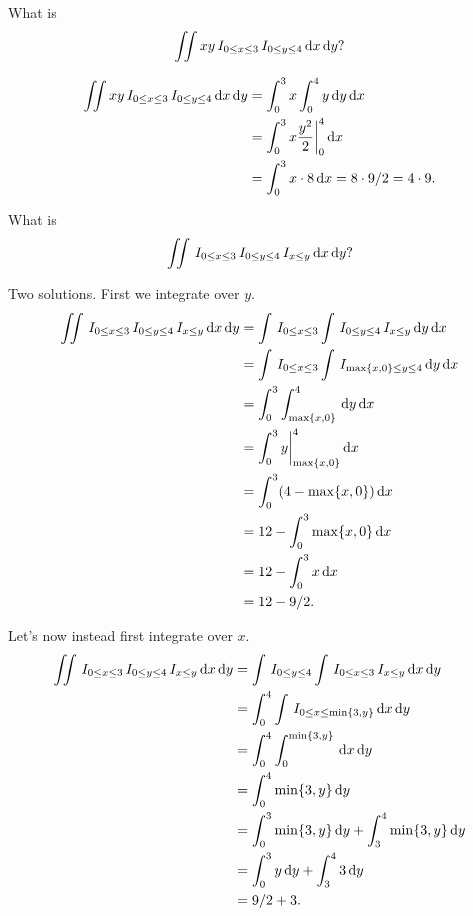 \begin{exercise}
What is
\begin{equation}
\label{eq:185}
\iint x y \,I_{0\leq x \leq 3}\,I_{0\leq y \leq 4} \,\textrm{d}x \,\textrm{d}y?
\end{equation}
\begin{solution}
\begin{align*}
\iint xy \,I_{0\leq x \leq 3}\,I_{0\leq y \leq 4} \,\textrm{d}x \,\textrm{d}y
&=\int_{0}^{3} x \int_{0}^{4} y \,\textrm{d}y \,\textrm{d}x\\
&=\int_{0}^{3} x \frac{y^{2}} 2 \biggr|_{0}^{4} \,\textrm{d}x\\
&= \int_{0}^{3} x\cdot 8 \,\textrm{d}x = 8\cdot 9/2 = 4\cdot 9.
\end{align*}
\end{solution}
\end{exercise}

\begin{exercise}
What is
\begin{align}
\label{eq:285}
\iint \,I_{0\leq x \leq 3} \,I_{0\leq y \leq 4}\,I_{x\leq y}\,\textrm{d}x \,\textrm{d}y?
\end{align}
\begin{solution}
Two solutions. First we integrate over $y$.
\begin{align}
\label{eq:385}
\iint \,I_{0\leq x \leq 3} \,I_{0\leq y \leq 4}\,I_{x\leq y}\,\textrm{d}x \,\textrm{d}y
&=\int \,I_{0\leq x \leq 3} \int \,I_{0\leq y \leq 4}\,I_{x\leq y}\,\textrm{d}y \,\textrm{d}x\\
&=\int \,I_{0\leq x \leq 3} \int \,I_{\max\{x, 0\} \leq y \leq 4}\,\textrm{d}y \,\textrm{d}x\\
&=\int_{0}^{3} \int_{\max\{x, 0\}}^{4}\,\textrm{d}y \,\textrm{d}x\\
&=\int_{0}^{3} y\biggr|_{\max\{x, 0\}}^{4} \,\textrm{d}x\\
&=\int_{0}^{3}  (4-\max\{x, 0\}) \,\textrm{d}x\\
&=12 - \int_{0}^{3} \max\{x, 0\} \,\textrm{d}x\\
&=12 - \int_{0}^{3} x  \,\textrm{d}x\\
&=12 - 9/2.
\end{align}

Let's now instead first integrate over $x$.
\begin{align}
\label{eq:485}
\iint \,I_{0\leq x \leq 3} \,I_{0\leq y \leq 4}\,I_{x\leq y}\,\textrm{d}x \,\textrm{d}y
&= \int \,I_{0\leq y \leq 4} \int \,I_{0\leq x \leq 3} \,I_{x\leq y}\,\textrm{d}x \,\textrm{d}y\\
&= \int_{0}^{4} \int \,I_{0\leq x \leq \min\{3, y\}}\,\textrm{d}x \,\textrm{d}y\\
&= \int_{0}^{4} \int_{0}^{\min\{3, y\}} \,\textrm{d}x \,\textrm{d}y\\
&= \int_{0}^{4} \min\{3, y\}\,\textrm{d}y\\
&= \int_{0}^{3} \min\{3, y\}\,\textrm{d}y + \int_{3}^{4} \min\{3, y\}\,\textrm{d}y\\
&= \int_{0}^{3} y \,\textrm{d}y + \int_{3}^{4}  3\,\textrm{d}y\\
&= 9/2 + 3.
\end{align}
\end{solution}
\end{exercise}


